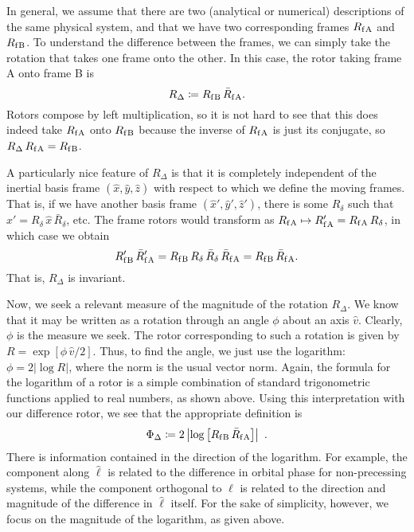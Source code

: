 \documentclass[aps,prd,amsmath,floatfix,twocolumn,superscriptaddress,nofootinbib,showpacs]{revtex4-1}
\newcommand{\ellHat}{\ensuremath{\hat{\ell}}}
\newcommand{\Rf}[1][]{\ensuremath{R_{\text{f#1}}}}
\newcommand{\Rbarf}[1][]{\ensuremath{\bar{R}_{\text{f#1}}}}
\newcommand{\RfA}{\Rf[\hspace{0.1em}A]}
\newcommand{\RfB}{\Rf[\hspace{0.1em}B]}
\newcommand{\RbarfA}{\Rbarf[\hspace{0.1em}A]}
\newcommand{\defined}{\coloneqq}
\begin{document}
In general, we assume that there are two (analytical or numerical)
descriptions of the same physical system, and that we have two
corresponding frames $\RfA$ and $\RfB$.  To understand the difference
between the frames, we can simply take the rotation that takes one
frame onto the other.  In this case, the rotor taking frame A onto
frame B is
\begin{equation}
  R_{\Delta} \defined \RfB\, \RbarfA.
\end{equation}
Rotors compose by left multiplication, so it is not hard to see that
this does indeed take $\RfA$ onto $\RfB$ because the inverse of $\RfA$
is just its conjugate, so $R_{\Delta}\, \RfA = \RfB$.

A particularly nice feature of $R_{\Delta}$ is that it is completely
independent of the inertial basis frame
$(\hat{x}, \hat{y}, \hat{z})$ with respect to which we define the
moving frames.  That is, if we have another basis frame
$(\hat{x}', \hat{y}', \hat{z}')$, there is some $R_{\delta}$ such
that $\hat{x}' = R_{\delta}\, \hat{x}\, \bar{R}_{\delta}$, etc.  The
frame rotors would transform as $\RfA \mapsto \RfA' = \RfA\,
R_{\delta}$, in which case we obtain
\begin{equation}
  \RfB'\, \RbarfA' = \RfB\, R_{\delta}\, \bar{R}_{\delta}\, \RbarfA =
  \RfB\, \RbarfA.
\end{equation}
That is, $R_{\Delta}$ is invariant.

Now, we seek a relevant measure of the magnitude of the rotation
$R_{\Delta}$.  We know that it may be written as a rotation through an
angle $\phi$ about an axis $\hat{v}$.  Clearly, $\phi$ is the measure
we seek.  The rotor corresponding to such a rotation is given by
$R = \exp[\phi\, \hat{v}/2]$.  Thus, to find the angle, we just use
the logarithm: $\phi = 2 \lvert \log R \rvert$, where the norm is the
usual vector norm.  Again, the formula for the logarithm of a rotor is
a simple combination of standard trigonometric functions applied to
real numbers, as shown above.  Using this interpretation with our
difference rotor, we see that the appropriate definition is
\begin{equation}
  \Phi_{\Delta} \defined 2 \left\lvert \log \left[ \RfB\, \RbarfA
    \right] \right\rvert~.
\end{equation}
There is information contained in the direction of the logarithm.  For
example, the component along $\ellHat$ is related to the difference in
orbital phase for non-precessing systems, while the component
orthogonal to $\ellHat$ is related to the direction and magnitude of
the difference in $\ellHat$ itself.  For the sake of simplicity,
however, we focus on the magnitude of the logarithm, as given above.
\end{document}
